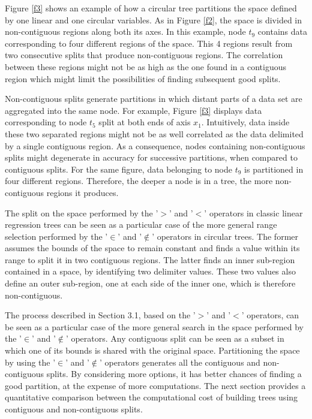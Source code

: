 \documentclass[times,twocolumn,final,authoryear]{elsarticle}
\begin{document}
Figure \ref{f3} shows an example of how a circular tree partitions the space defined by one linear and one circular variables. As in Figure \ref{f2}, the space is divided in non-contiguous regions along both its axes. In this example, node $t_9$ contains data corresponding to four different regions of the space. This 4 regions result from two consecutive splits that produce non-contiguous regions. The correlation between these regions might not be as high as the one found in a contiguous region which might limit the possibilities of finding subsequent good splits. 

Non-contiguous splits generate partitions in which distant parts of a data set are aggregated into the same node. For example, Figure \ref{f3} displays data corresponding to node $t_5$ split at both ends of axis $x_1$. Intuitively, data inside these two separated regions might not be as well correlated as the data delimited by a single contiguous region. As a consequence, nodes containing non-contiguous splits might degenerate in accuracy for successive partitions, when compared to contiguous splits. For the same figure, data belonging to node $t_9$ is partitioned in four different regions. Therefore, the deeper a node is in a tree, the more non-contiguous regions it produces.

The split on the space performed by the '$>$' and '$<$' operators in classic linear regression trees can be seen as a particular case of the more general range selection performed by the '$\in$' and '$\notin$' operators in circular trees. The former assumes the bounds of the space to remain constant and finds a value within its range to split it in two contiguous regions. The latter finds an inner sub-region contained in a space, by identifying two delimiter values. These two values also define an outer sub-region, one at each side of the inner one, which is therefore non-contiguous.

The process described in Section 3.1, based on the '$>$' and '$<$' operators, can be seen as a particular case of the more general search in the space performed by the '$\in$' and '$\notin$' operators. Any contiguous split can be seen as a subset in which one of its bounds is shared with the original space. Partitioning the space by using the '$\in$' and '$\notin$' operators generates all the contiguous and non-contiguous splits. By considering more options, it has better chances of finding a good partition, at the expense of more computations. The next section provides a quantitative comparison between the computational cost of building trees using contiguous and non-contiguous splits.
\end{document}
